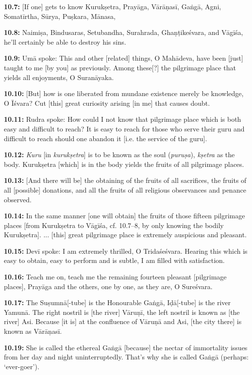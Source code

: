 \documentclass{article}
\newcommand{\vsnum}[1]{\textbf{#1}}
\newcommand{\skt}[1]{\textit{#1}}
\begin{document}
\vsnum{10.7: }[If one] gets to know Kurukṣetra, Prayāga, Vārāṇasī, Gaṅgā, Agni, Somatīrtha, Sūrya, Puṣkara, Mānasa,

\vsnum{10.8: }Naimiṣa, Bindusaras, Setubandha, Surahrada, Ghaṇṭikeśvara, and Vāgīśa, he'll certainly be able to destroy his sins.

\vsnum{10.9: }Umā spoke: This and other [related] things, O Mahādeva, have been [just] taught to me [by you] as previously. Among these[?] the pilgrimage place that yields all enjoyments, O Suranāyaka.

\vsnum{10.10: }[But] how is one liberated from mundane existence merely be knowledge, O Īśvara? Cut [this] great curiosity arising [in me] that causes doubt.

\vsnum{10.11: }Rudra spoke: How could I not know that pilgrimage place which is both easy and difficult to reach? It is easy to reach for those who serve their guru and difficult to reach should one abandon it [i.e. the service of the guru].

\vsnum{10.12: }\skt{Kuru} [in \skt{kurukṣetra}] is to be known as the soul (\skt{puruṣa}), \skt{kṣetra} as the body. Kurukṣetra [which] is in the body yields the fruits of all pilgrimage places.

\vsnum{10.13: }[And there will be] the obtaining of the fruits of all sacrifices, the fruits of all [possible] donations, and all the fruits of all religious observances and penance observed.

\vsnum{10.14: }In the same manner [one will obtain] the fruits of those fifteen pilgrimage places [from Kurukṣetra to Vāgīśa, cf. 10.7--8, by only knowing the bodily Kurukṣetra]. ... [this] great pilgrimage place is extremely auspicious and pleasant.

\vsnum{10.15: }Devī spoke: I am extremely thrilled, O Tridaśeśvara. Hearing this which is easy to obtain, easy to perform and is subtle, I am filled with satisfaction.

\vsnum{10.16: }Teach me on, teach me the remaining fourteen pleasant [pilgrimage places], Prayāga and the others, one by one, as they are, O Sureśvara.

\vsnum{10.17: }The Suṣumnā[-tube] is the Honourable Gaṅgā, Iḍā[-tube] is the river Yamunā. The right nostril is [the river] Vāruṇī, the left nostril is known as [the river] Asi. Because [it is] at the confluence of Vāruṇā and Asi, [the city there] is known as Vārāṇasī.

\vsnum{10.19: }She is called the ethereal Gaṅgā [because] the nectar of immortality issues from her day and night uninterruptedly. That's why she is called Gaṅgā (perhaps: `ever-goer').
\end{document}
